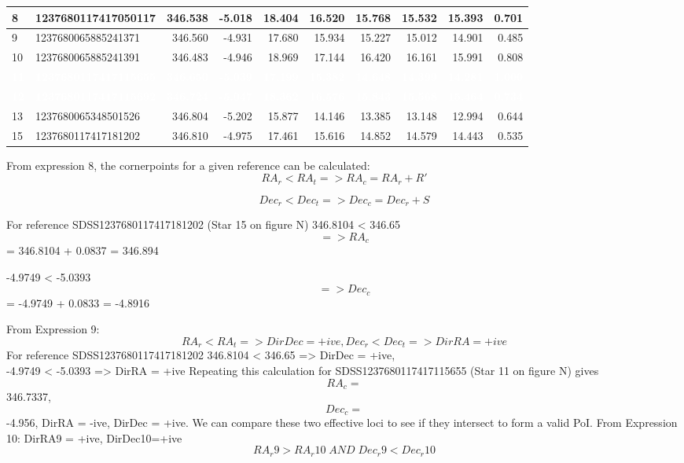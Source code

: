 \documentclass[]{elsarticle} %
\begin{document}
\begin{table}[H]
\begin{tabular}{l|l|r|r|r|r|r|r|r|r}
\hline
8 & 1237680117417050117 & 346.538 & -5.018 & 18.404 & 16.520 & 15.768 & 15.532 & 15.393 & 0.701\\
\hline
9 & 1237680065885241371 & 346.560 & -4.931 & 17.680 & 15.934 & 15.227 & 15.012 & 14.901 & 0.485\\
\hline
10 & 1237680065885241391 & 346.483 & -4.946 & 18.969 & 17.144 & 16.420 & 16.161 & 15.991 & 0.808\\
\hline
\rowcolor[HTML]{D7261E}  \textcolor{white}{\textbf{11}} & \textcolor{white}{\textbf{1237680117417115655}} & \textcolor{white}{\textbf{346.650}} & \textcolor{white}{\textbf{-5.039}} & \textcolor{white}{\textbf{17.199}} & \textcolor{white}{\textbf{15.382}} & \textcolor{white}{\textbf{14.648}} & \textcolor{white}{\textbf{14.399}} & \textcolor{white}{\textbf{14.281}} & \textcolor{white}{\textbf{1.000}}\\
\hline
\rowcolor[HTML]{D7261E}  \textcolor{white}{\textbf{12}} & \textcolor{white}{\textbf{1237680117417115692}} & \textcolor{white}{\textbf{346.724}} & \textcolor{white}{\textbf{-5.047}} & \textcolor{white}{\textbf{18.362}} & \textcolor{white}{\textbf{16.576}} & \textcolor{white}{\textbf{15.843}} & \textcolor{white}{\textbf{15.568}} & \textcolor{white}{\textbf{15.464}} & \textcolor{white}{\textbf{0.734}}\\
\hline
13 & 1237680065348501526 & 346.804 & -5.202 & 15.877 & 14.146 & 13.385 & 13.148 & 12.994 & 0.644\\
\hline
15 & 1237680117417181202 & 346.810 & -4.975 & 17.461 & 15.616 & 14.852 & 14.579 & 14.443 & 0.535\\
\hline
\end{tabular}
\end{table}

\newpage

From expression 8, the cornerpoints for a given reference can be
calculated: \[RA_r < RA_t => RA_c = RA_r + R'\]

\[Dec_r < Dec_t => Dec_c = Dec_r + S\]

For reference SDSS1237680117417181202 (Star 15 on figure N) \vskip 0.2in
346.8104 \textless{} 346.65 \[=> RA_c\] = 346.8104 + 0.0837 = 346.894

-4.9749 \textless{} -5.0393\[ => Dec_c\] = -4.9749 + 0.0833 = -4.8916

From Expression 9:
\[RA_r < RA_t =>  DirDec = +ive,  Dec_r < Dec_t =>  DirRA = +ive\]
\vskip 0.2in For reference SDSS1237680117417181202 \vskip 0.2in 346.8104
\textless{} 346.65 =\textgreater{} DirDec = +ive,\\
-4.9749 \textless{} -5.0393 =\textgreater{} DirRA = +ive \vskip 0.2in
Repeating this calculation for SDSS1237680117417115655 (Star 11 on
figure N) gives \[RA_c = \] 346.7337, \[Dec_c = \] -4.956, \vskip 0.2in
DirRA = -ive, DirDec = +ive. We can compare these two effective loci to
see if they intersect to form a valid PoI. \vskip 0.2in From Expression
10: DirRA9 = +ive, DirDec10=+ive
\[RA_r9> RA_r10\;AND\; Dec_r9 < Dec_r10\]
\end{document}
